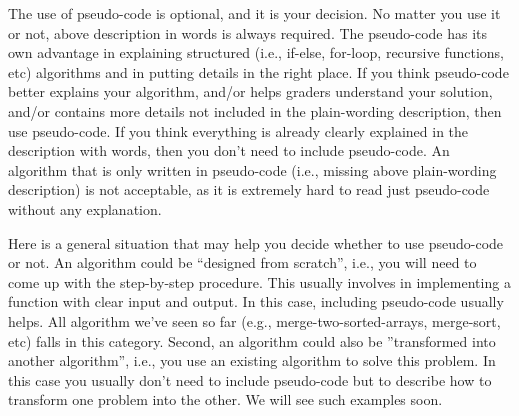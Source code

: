 \documentclass[11pt]{article}
\begin{document}
The use of pseudo-code is optional, and it is your decision. No matter you use it or not, above description in words is always required. The pseudo-code has its own advantage in explaining structured (i.e., if-else, for-loop, recursive functions, etc) algorithms and in putting details in the right place. If you think pseudo-code better explains your algorithm, and/or helps graders understand your solution, and/or contains more details not included in the plain-wording description, then use pseudo-code. If you think everything is already clearly explained in the description with words, then you don't need to include pseudo-code. An algorithm that is only written in pseudo-code (i.e., missing above plain-wording description) is not acceptable, as it is extremely hard to read just pseudo-code without any explanation.

Here is a general situation that may help you decide whether to use pseudo-code or not. An algorithm could be ``designed from scratch'', i.e., you will need to come up with the step-by-step procedure. This usually involves in implementing a function with clear input and output. In this case, including pseudo-code usually helps. All algorithm we've seen so far (e.g., merge-two-sorted-arrays, merge-sort, etc) falls in this category. Second, an algorithm could also be ''transformed into another algorithm'', i.e., you use an existing algorithm to solve this problem. In this case you usually don't need to include pseudo-code but to describe how to transform one problem into the other. We will see such examples soon.

\clearpage\newpage
\end{document}

